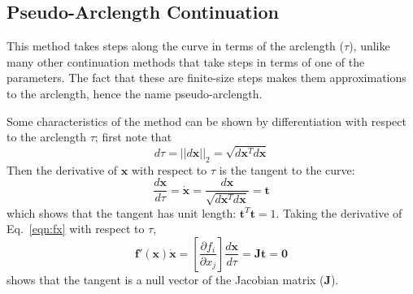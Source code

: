\documentclass[11pt,openany,twoside]{book}
\numberwithin{equation}{section}		%
\newcommand{\Newterm}[1]{{\em #1}}	%
\newcommand{\Matrix}[1]{\boldsymbol{#1}}
\newcommand{\Vector}[1]{\boldsymbol{#1}}
\newcommand{\Eqn}[1]{Eq.\ \ref{#1}}  %
\begin{document}
\subsection{Pseudo-Arclength Continuation}\label{sect:pseudo}
This method takes steps along the curve in terms of the arclength ($\tau$),
unlike many other continuation methods that take steps in terms of
one of the parameters. The fact that these are finite-size steps makes them
approximations to the arclength, hence the name pseudo-arclength.
\par

Some characteristics of the method can be shown by differentiation
with respect to the arclength $\tau$; first note that
\begin{equation}
d\tau = ||d\Vector{x}||_2 = \sqrt{d\Vector{x}^Td\Vector{x}}
\end{equation}
Then the derivative of $\Vector{x}$ with respect to $\tau$ is the
tangent to the curve:
\begin{equation}\label{eqn:t-properties}
\frac{d\Vector{x}}{d\tau} = \dot{\Vector{x}} =
 	\frac{d\Vector{x}}{\sqrt{d\Vector{x}^T d\Vector{x}}} = \Vector{t}
\end{equation}
which shows that the tangent has unit length: $\Vector{t}^T\Vector{t} = 1$.
Taking the derivative of \Eqn{eqn:fx} with respect to $\tau$,
\begin{equation}\label{eqn:fxprime}
\Vector{f}'(\Vector{x})\dot{\Vector{x}} =
	\left[\frac{\partial f_i}{\partial x_j}\right]\frac{d\Vector{x}}{d\tau}
	= \Matrix{J}\Vector{t} = \Vector{0}
\end{equation}
shows that the tangent is a null vector of the Jacobian matrix ($\Matrix{J}$).

\end{document}
